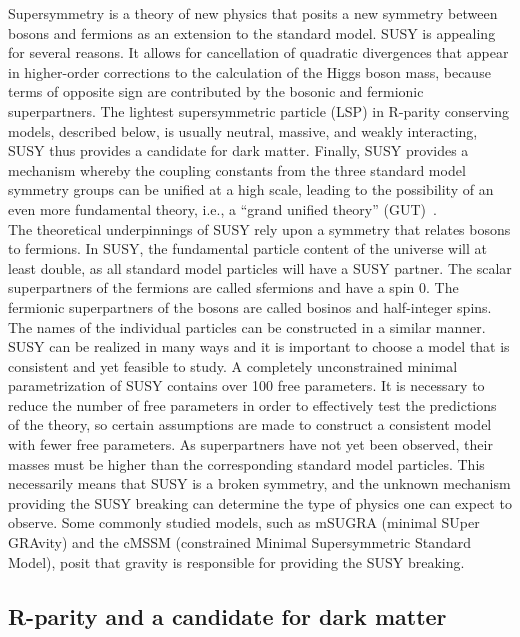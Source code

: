Supersymmetry is a theory of new physics that posits a new symmetry between
bosons and fermions as an extension to the standard model. SUSY is appealing for several
reasons. It allows for cancellation of quadratic divergences that appear in higher-order
corrections to the calculation of the Higgs boson mass, because terms of opposite sign
are contributed by the bosonic and fermionic superpartners. The
lightest supersymmetric particle (LSP) in R-parity conserving models, described below, is usually neutral,
massive, and weakly interacting, SUSY thus provides a candidate for dark matter. Finally,
SUSY provides a mechanism whereby the coupling constants from the three standard model
symmetry groups can be unified at a high scale, leading to the possibility of an even more
fundamental theory, i.e., a “grand unified theory” (GUT)~\cite{wess1992supersymmetry}.\\
\indent The theoretical underpinnings of SUSY rely upon a symmetry that relates bosons
to fermions. In SUSY, the fundamental particle content of the universe will at least double,
as all standard model particles will have a SUSY partner. 
The scalar superpartners of the fermions are called sfermions and have a spin 0. The fermionic 
superpartners of the bosons are called bosinos and half-integer spins. The names of the individual
particles can be constructed in a similar manner.
SUSY can be realized in many ways and it is important to choose a model that is
consistent and yet feasible to study. A completely unconstrained minimal parametrization
of SUSY contains over 100 free parameters. It is necessary to reduce the number of free
parameters in order to effectively test the predictions of the theory, so certain assumptions
are made to construct a consistent model with fewer free parameters. As superpartners
have not yet been observed, their masses must be higher than the corresponding standard
model particles. This necessarily means that SUSY is a broken symmetry, and the unknown
mechanism providing the SUSY breaking can determine the type of physics one can expect
to observe. Some commonly studied models, such as mSUGRA (minimal SUper GRAvity)
and the cMSSM (constrained Minimal Supersymmetric Standard Model), posit that gravity
is responsible for providing the SUSY breaking.

\subsection{R-parity and a candidate for dark matter}


